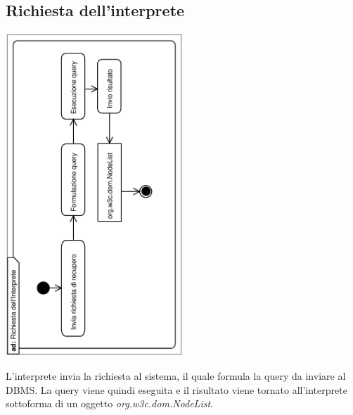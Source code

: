 \documentclass[11pt,titlepage,a4paper]{report}
\begin{document}
\subsection{Richiesta dell'interprete}
\begin{center}
 \includegraphics[width=0.5\textwidth, angle=-90]{RichiestadellInterprete.eps}
\end{center}
L'interprete invia la richiesta al sistema, il quale formula la query da inviare al DBMS. La query viene quindi eseguita e il risultato viene tornato all'interprete sottoforma di un oggetto \textit{org.w3c.dom.NodeList}.
\end{document}
